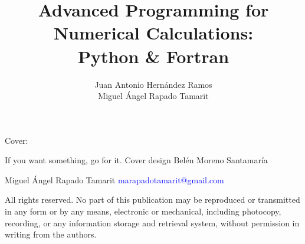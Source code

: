 \documentclass[a4paper,10pt,twoside,english]{book}
\title{{\fontsize{27}{33}\selectfont Advanced Programming for \\ Numerical Calculations:  \\  \vspace{0.8cm} } 
	 {\fontsize{27}{33}\selectfont Python \& Fortran\\ }
	 }
\author{ Juan Antonio Hern\'andez Ramos\\ 	
  	         Miguel \'Angel Rapado Tamarit\\
            \vspace{5cm} } %
\date{  } %
\begin{document}
 
  
   
    \maketitle
    \thispagestyle{empty}   %
    
    
    \noindent  Cover: 
    
    \noindent If you want something, go for it. Cover design Belén Moreno Santamaría
   
 
    \vfill  
    \begin{minipage}[b]{0.9\textwidth}
        
        \vspace*{2\baselineskip}
        Miguel Ángel Rapado Tamarit \newline
        \textcolor{Blue}{marapadotamarit@gmail.com}
        \vspace*{3\baselineskip}
        
        
    \end{minipage}
    
    \noindent
    All rights reserved.
    No part of this publication may be reproduced or transmitted in any form or by any means, electronic or mechanical, including photocopy, recording, or any information storage and retrieval system, without permission in writing from the authors. 
    \vspace{2\baselineskip}
    
\end{document}

